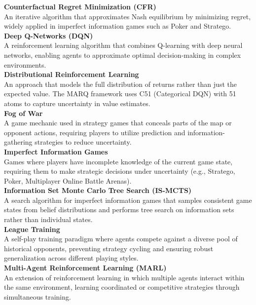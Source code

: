\noindent\textbf{Counterfactual Regret Minimization (CFR)} \\
An iterative algorithm that approximates Nash equilibrium by minimizing regret, widely applied in imperfect information games such as Poker and Stratego. \\[6pt]

\noindent\textbf{Deep Q-Networks (DQN)} \\
A reinforcement learning algorithm that combines Q-learning with deep neural networks, enabling agents to approximate optimal decision-making in complex environments. \\[6pt]

\noindent\textbf{Distributional Reinforcement Learning} \\
An approach that models the full distribution of returns rather than just the expected value. The MARQ framework uses C51 (Categorical DQN) with 51 atoms to capture uncertainty in value estimates. \\[6pt]

\noindent\textbf{Fog of War} \\
A game mechanic used in strategy games that conceals parts of the map or opponent actions, requiring players to utilize prediction and information-gathering strategies to reduce uncertainty. \\[6pt]

\noindent\textbf{Imperfect Information Games} \\
Games where players have incomplete knowledge of the current game state, requiring them to make strategic decisions under uncertainty (e.g., Stratego, Poker, Multiplayer Online Battle Arenas). \\[6pt]

\noindent\textbf{Information Set Monte Carlo Tree Search (IS-MCTS)} \\
A search algorithm for imperfect information games that samples consistent game states from belief distributions and performs tree search on information sets rather than individual states. \\[6pt]

\noindent\textbf{League Training} \\
A self-play training paradigm where agents compete against a diverse pool of historical opponents, preventing strategy cycling and ensuring robust generalization across different playing styles. \\[6pt]

\noindent\textbf{Multi-Agent Reinforcement Learning (MARL)} \\
An extension of reinforcement learning in which multiple agents interact within the same environment, learning coordinated or competitive strategies through simultaneous training. \\[6pt]

